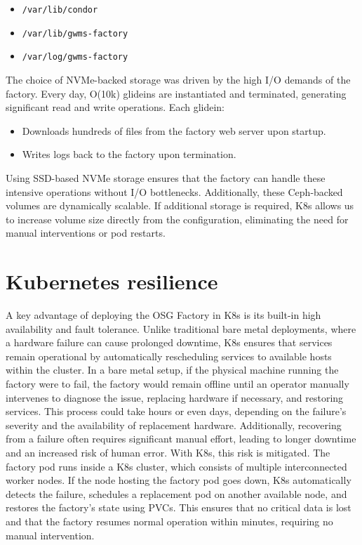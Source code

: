 \documentclass{webofc}
\begin{document}
\begin{itemize}
\item \verb"/var/lib/condor"
\item \verb"/var/lib/gwms-factory"
\item \verb"/var/log/gwms-factory"
\end{itemize}

The choice of NVMe-backed storage was driven by the high I/O demands of the factory. Every day, O(10k) glideins are instantiated and terminated, generating significant read and write operations. Each glidein:

    \begin{itemize}
        \item Downloads hundreds of files from the factory web server upon startup.
        \item Writes logs back to the factory upon termination.
    \end{itemize}

Using SSD-based NVMe storage ensures that the factory can handle these intensive operations without I/O bottlenecks. Additionally, these Ceph-backed volumes are dynamically scalable. If additional storage is required, K8s allows us to increase volume size directly from the configuration, eliminating the need for manual interventions or pod restarts.

\section{Kubernetes resilience}
\label{resilience}

A key advantage of deploying the OSG Factory in K8s is its built-in high availability and fault tolerance. Unlike traditional bare metal deployments, where a hardware failure can cause prolonged downtime, K8s ensures that services remain operational by automatically rescheduling services to available hosts within the cluster. In a bare metal setup, if the physical machine running the factory were to fail, the factory would remain offline until an operator manually intervenes to diagnose the issue, replacing hardware if necessary, and restoring services. This process could take hours or even days, depending on the failure’s severity and the availability of replacement hardware. Additionally, recovering from a failure often requires significant manual effort, leading to longer downtime and an increased risk of human error. With K8s, this risk is mitigated. The factory pod runs inside a K8s cluster, which consists of multiple interconnected worker nodes. If the node hosting the factory pod goes down, K8s automatically detects the failure, schedules a replacement pod on another available node, and restores the factory’s state using PVCs. This ensures that no critical data is lost and that the factory resumes normal operation within minutes, requiring no manual intervention.
\end{document}
